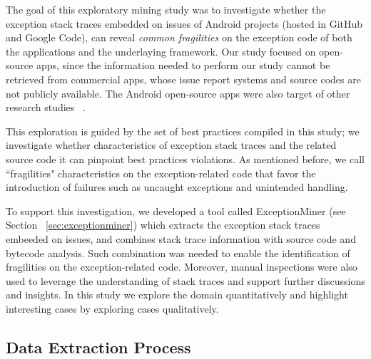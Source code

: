 \documentclass[conference]{IEEEtran}
\begin{document}

The goal of this exploratory mining study was to investigate whether the exception stack traces 
embedded on issues of Android projects (hosted in GitHub and Google Code), can reveal 
\emph{common fragilities} on the exception code of both the applications and the underlaying  framework. 
Our study focused on open-source apps, since the information needed to perform our study
cannot be retrieved from commercial apps, whose issue report systems and 
source codes are not publicly available. The Android open-source apps were also 
target of other research studies ~\cite{Linar13,ahimed}.   

This exploration is guided by the set of best practices compiled in this study; we investigate whether characteristics 
of exception stack traces and the related source code it can pinpoint best practices violations. As mentioned before, 
we call ``fragilities" characteristics on the exception-related code that favor the introduction
of failures such as uncaught exceptions and unintended handling. 

To support this investigation, we developed a tool called ExceptionMiner (see Section ~\ref{sec:exceptionminer})
which extracts the exception stack traces embeeded on issues, 
and combines stack trace information with source code and bytecode 
analysis. Such combination was needed to enable the identification of 
fragilities on the exception-related code.
Moreover, manual inspections were also used to leverage
 the understanding of stack traces and support further discussions and insights.
In this study we explore the domain quantitatively and highlight interesting cases by 
exploring cases qualitatively.  

\subsection{Data Extraction Process}
\label{sec:miningproc}
\end{document}
